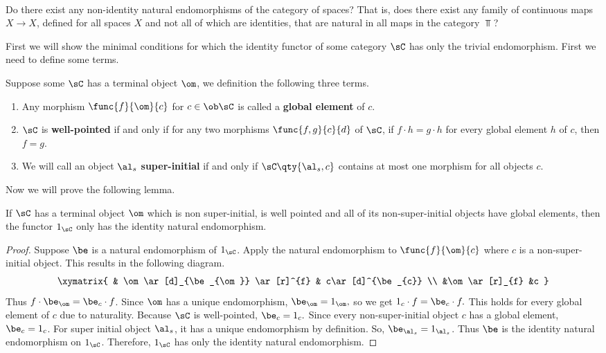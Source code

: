 \documentclass[main.tex]{subfiles}
\begin{document}
\paragraph{}
\begin{exercise}
Do there exist any non-identity natural endomorphisms of the category of spaces?
That is, does there exist any family of continuous maps $X\rightarrow X$,
defined for all spaces $X$ and not all of which are identities, that are natural
in all maps in the category $\Top$?
\end{exercise}

First we will show the minimal conditions for which the identity functor of some
category $\sC$ has only the trivial endomorphism. First we need to define some
terms.

\begin{definition}
	Suppose some $\sC$ has a terminal object $\om$, we definition the following three terms.
	\begin{enumerate}
		\item Any morphism $\func{f}{\om}{c}$ for $c \in \ob \sC$ is
			called a {\bf global element} of $c.$
		\item $\sC$ is {\bf well-pointed} if and only if for any two
			morphisms
		$\func{f,g}{c}{d}$ of $\sC$, if $f \cdot h = g \cdot h$ for
		every
		global element $h$ of $c$, then $f = g.$
		\item We will call an object $\al_{s}$ {\bf super-initial} if
			and only
		if $\sC\qty{\al_{s},c}$ contains at most one morphism for all
		objects
		$c.$
	\end{enumerate}
\end{definition}

Now we will prove the following lemma.
\begin{lemma}
	If $\sC$ has a terminal object $\om$ which is non super-initial, is well
	pointed and all of its non-super-initial objects have global elements, then
	the functor $1_{\sC}$ only has the identity natural endomorphism.
\end{lemma}

\begin{proof}
	Suppose $\be$ is a natural endomorphism of $1_{\sC}$. Apply the natural
	endomorphism to $\func{f}{\om}{c}$ where $c$ is a non-super-initial object.
	This results in the following diagram.
	$$\xymatrix{ & \om \ar[d]_{\be_{\om}}
	\ar[r]^{f} & c\ar[d]^{\be_{c}}  \\   &\om \ar[r]_{f} &c  }
	$$
	Thus $f \cdot \be_{\om} = \be_{c} \cdot f$.
	Since $\om$ has a unique endomorphism, $\be_{\om} = 1_{\om},$ so we get
	$1_{c} \cdot f  = \be_{c} \cdot f.$ This holds for every global element of
	$c$ due to naturality. Because
	$\sC$ is well-pointed, $\be_{c} = 1_{c}.$ Since every non-super-initial
	object $c$ has a global element, $\be_{c} = 1_{c}$. For super initial
	object $\al_{s}$, it has a unique endomorphism by definition. So,
	$\be_{\al_{s}} = 1_{\al_{s}}$. Thus $\be$ is the identity natural
	endomorphism on $1_{\sC}$. Therefore, $1_{\sC}$ has only the identity
	natural endomorphism.
\end{proof}
\end{document}
